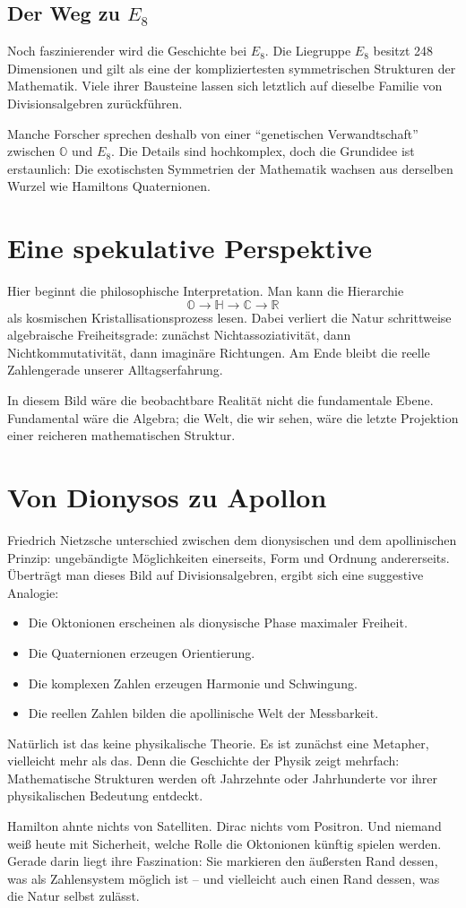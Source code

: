 \documentclass[11pt,a4paper]{article}
\begin{document}
\subsection*{Der Weg zu \(E_8\)}
Noch faszinierender wird die Geschichte bei \(E_8\). Die Liegruppe \(E_8\) besitzt 248 Dimensionen und gilt als eine der kompliziertesten symmetrischen Strukturen der Mathematik. Viele ihrer Bausteine lassen sich letztlich auf dieselbe Familie von Divisionsalgebren zurückführen.

Manche Forscher sprechen deshalb von einer ``genetischen Verwandtschaft'' zwischen \(\mathbb O\) und \(E_8\). Die Details sind hochkomplex, doch die Grundidee ist erstaunlich: Die exotischsten Symmetrien der Mathematik wachsen aus derselben Wurzel wie Hamiltons Quaternionen.

\section{Eine spekulative Perspektive}
Hier beginnt die philosophische Interpretation. Man kann die Hierarchie
\[
\mathbb O \rightarrow \mathbb H \rightarrow \mathbb C \rightarrow \mathbb R
\]
als kosmischen Kristallisationsprozess lesen. Dabei verliert die Natur schrittweise algebraische Freiheitsgrade: zunächst Nichtassoziativität, dann Nichtkommutativität, dann imaginäre Richtungen. Am Ende bleibt die reelle Zahlengerade unserer Alltagserfahrung.

In diesem Bild wäre die beobachtbare Realität nicht die fundamentale Ebene. Fundamental wäre die Algebra; die Welt, die wir sehen, wäre die letzte Projektion einer reicheren mathematischen Struktur.

\section{Von Dionysos zu Apollon}
Friedrich Nietzsche unterschied zwischen dem dionysischen und dem apollinischen Prinzip: ungebändigte Möglichkeiten einerseits, Form und Ordnung andererseits. Überträgt man dieses Bild auf Divisionsalgebren, ergibt sich eine suggestive Analogie:
\begin{itemize}
  \item Die Oktonionen erscheinen als dionysische Phase maximaler Freiheit.
  \item Die Quaternionen erzeugen Orientierung.
  \item Die komplexen Zahlen erzeugen Harmonie und Schwingung.
  \item Die reellen Zahlen bilden die apollinische Welt der Messbarkeit.
\end{itemize}

Natürlich ist das keine physikalische Theorie. Es ist zunächst eine Metapher, vielleicht mehr als das. Denn die Geschichte der Physik zeigt mehrfach: Mathematische Strukturen werden oft Jahrzehnte oder Jahrhunderte vor ihrer physikalischen Bedeutung entdeckt.

Hamilton ahnte nichts von Satelliten. Dirac nichts vom Positron. Und niemand weiß heute mit Sicherheit, welche Rolle die Oktonionen künftig spielen werden. Gerade darin liegt ihre Faszination: Sie markieren den äußersten Rand dessen, was als Zahlensystem möglich ist -- und vielleicht auch einen Rand dessen, was die Natur selbst zulässt.
\end{document}

